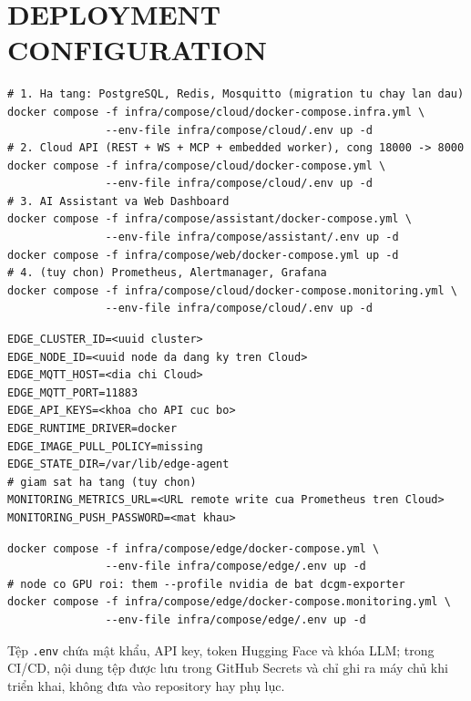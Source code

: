 \chapter{DEPLOYMENT CONFIGURATION}

\begin{lstlisting}[caption={Triển khai Cloud trên máy chủ}]
# 1. Ha tang: PostgreSQL, Redis, Mosquitto (migration tu chay lan dau)
docker compose -f infra/compose/cloud/docker-compose.infra.yml \
               --env-file infra/compose/cloud/.env up -d
# 2. Cloud API (REST + WS + MCP + embedded worker), cong 18000 -> 8000
docker compose -f infra/compose/cloud/docker-compose.yml \
               --env-file infra/compose/cloud/.env up -d
# 3. AI Assistant va Web Dashboard
docker compose -f infra/compose/assistant/docker-compose.yml \
               --env-file infra/compose/assistant/.env up -d
docker compose -f infra/compose/web/docker-compose.yml up -d
# 4. (tuy chon) Prometheus, Alertmanager, Grafana
docker compose -f infra/compose/cloud/docker-compose.monitoring.yml \
               --env-file infra/compose/cloud/.env up -d
\end{lstlisting}

\begin{lstlisting}[caption={Cấu hình Edge Node (\texttt{infra/compose/edge/.env})}]
EDGE_CLUSTER_ID=<uuid cluster>
EDGE_NODE_ID=<uuid node da dang ky tren Cloud>
EDGE_MQTT_HOST=<dia chi Cloud>
EDGE_MQTT_PORT=11883
EDGE_API_KEYS=<khoa cho API cuc bo>
EDGE_RUNTIME_DRIVER=docker
EDGE_IMAGE_PULL_POLICY=missing
EDGE_STATE_DIR=/var/lib/edge-agent
# giam sat ha tang (tuy chon)
MONITORING_METRICS_URL=<URL remote write cua Prometheus tren Cloud>
MONITORING_PUSH_PASSWORD=<mat khau>
\end{lstlisting}

\begin{lstlisting}[caption={Khởi chạy Edge Agent và giám sát trên thiết bị}]
docker compose -f infra/compose/edge/docker-compose.yml \
               --env-file infra/compose/edge/.env up -d
# node co GPU roi: them --profile nvidia de bat dcgm-exporter
docker compose -f infra/compose/edge/docker-compose.monitoring.yml \
               --env-file infra/compose/edge/.env up -d
\end{lstlisting}

Tệp \texttt{.env} chứa mật khẩu, API key, token Hugging Face và khóa LLM; trong
CI/CD, nội dung tệp được lưu trong GitHub Secrets và chỉ ghi ra máy chủ khi triển
khai, không đưa vào repository hay phụ lục.
